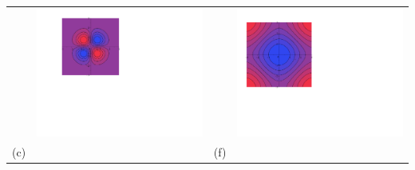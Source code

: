 \documentclass[12pt]{article}
\begin{document}
\begin{enumerate}
\begin{center}
\begin{tabular}{lc|cc}
&\includegraphics[scale=0.56]{matching2.pdf} && \includegraphics[scale=0.48]{matching5.pdf}\\
(c)&&(f)\\

\end{tabular}
\end{center}
\end{enumerate}
\end{document}
